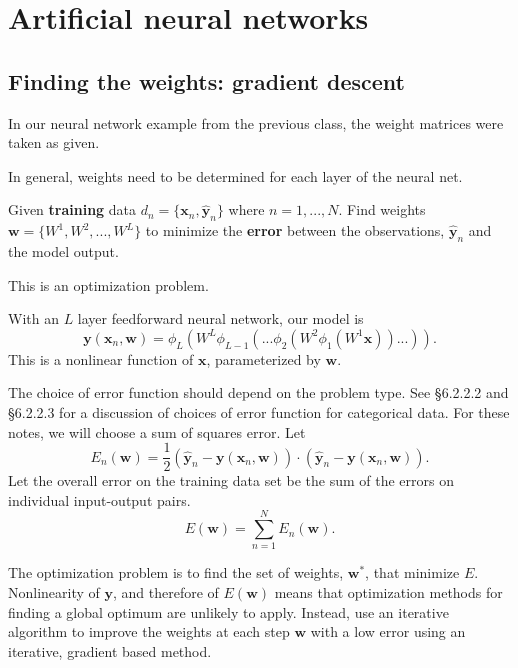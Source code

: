 \documentclass[12pt,letterpaper,noanswers]{exam}
\newcommand{\vc}[1]{\boldsymbol{#1}}
\begin{document}
\section*{Artificial neural networks}
\subsection*{Finding the weights: gradient descent}
In our neural network example from the previous class, the weight matrices were taken as given.

In general, weights need to be determined for each layer of the neural net.
\begin{tcolorbox}
Given \textbf{training} data $d_n = \{\vc{x}_n,\hat{\vc{y}}_n\}$ where $n=1,...,N$.  Find weights $\vc{w} = \{W^1,W^2,...,W^L\}$ to minimize the \textbf{error} between the observations, $\hat{\vc{y}}_n$ and the model output.

This is an optimization problem.

\end{tcolorbox}

With an $L$ layer feedforward neural network, our model is \[\vc{y}(\vc{x}_n,\vc{w}) = \phi_L(W^L\phi_{L-1}(...\phi_2(W^2\phi_1(W^1\vc{x}))...)).\] This is a nonlinear function of $\vc{x}$, parameterized by $\vc{w}$.

The choice of error function should depend on the problem type.  See \cite{Goodfellow-et-al-2016} \S 6.2.2.2 and \S 6.2.2.3 for a discussion of choices of error function for categorical data.  For these notes, we will choose a sum of squares error.  Let \[E_n(\vc{w}) = \dfrac{1}{2}\left(\hat{\vc{y}}_n-\vc{y}(\vc{x}_n,\vc{w})\right)\cdot\left(\hat{\vc{y}}_n-\vc{y}(\vc{x}_n,\vc{w})\right).\]
Let the overall error on the training data set be the sum of the errors on individual input-output pairs.
\[E(\vc{w}) = \sum\limits_{n=1}^N E_n(\vc{w}).\]

The optimization problem is to find the set of weights, $\vc{w}^*$, that minimize $E$.  Nonlinearity of $\vc{y}$, and therefore of $E(\vc{w})$ means that optimization methods for finding a global optimum are unlikely to apply. Instead, use an iterative algorithm to improve the weights at each step $\vc{w}$ with a low error using an iterative, gradient based method.  
\end{document}
